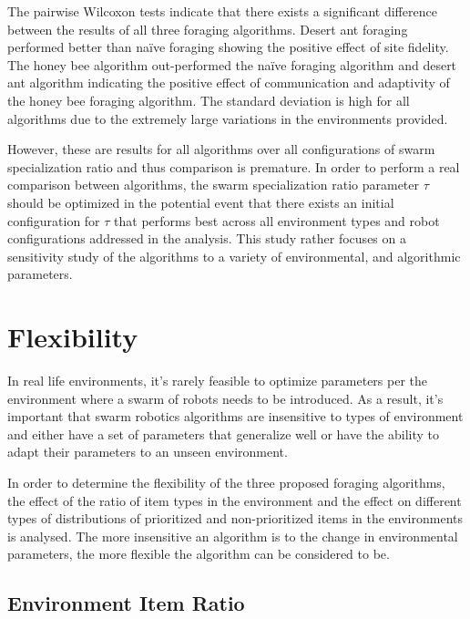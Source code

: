 The pairwise Wilcoxon tests indicate that there exists a significant difference between the results of all three foraging algorithms. Desert ant foraging performed better than na\"ive foraging showing the positive effect of site fidelity. The honey bee algorithm out-performed the na\"ive foraging algorithm and desert ant algorithm indicating the positive effect of communication and adaptivity of the honey bee foraging algorithm. The standard deviation is high for all algorithms due to the extremely large variations in the environments provided.

However, these are results for all algorithms over all configurations of swarm specialization ratio and thus comparison is premature. In order to perform a real comparison between algorithms, the swarm specialization ratio parameter $\tau$ should be optimized in the potential event that there exists an initial configuration for $\tau$ that performs best across all environment types and robot configurations addressed in the analysis. This study rather focuses on a sensitivity study of the algorithms to a variety of environmental, and algorithmic parameters.


\section{Flexibility}
\label{results:flexibility}

In real life environments, it's rarely feasible to optimize parameters per the environment where a swarm of robots needs to be introduced. As a result, it's important that swarm robotics algorithms are insensitive to types of environment and either have a set of parameters that generalize well or have the ability to adapt their parameters to an unseen environment.

In order to determine the flexibility of the three proposed foraging algorithms, the effect of the ratio of item types in the environment and the effect on different types of distributions of prioritized and non-prioritized items in the environments is analysed. The more insensitive an algorithm is to the change in environmental parameters, the more flexible the algorithm can be considered to be. 

\subsection{Environment Item Ratio}
\label{results:ratio}

